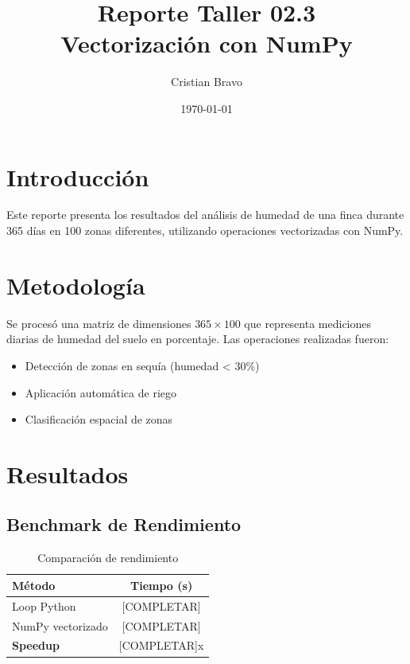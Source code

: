 \documentclass[11pt,a4paper]{article}
\title{Reporte Taller 02.3\\Vectorización con NumPy}
\author{Cristian Bravo}
\date{\today}
\begin{document}
\maketitle

\section{Introducción}

Este reporte presenta los resultados del análisis de humedad de una finca durante 365 días en 100 zonas diferentes, utilizando operaciones vectorizadas con NumPy.

\section{Metodología}

Se procesó una matriz de dimensiones $365 \times 100$ que representa mediciones diarias de humedad del suelo en porcentaje. Las operaciones realizadas fueron:

\begin{itemize}
    \item Detección de zonas en sequía (humedad < 30\%)
    \item Aplicación automática de riego
    \item Clasificación espacial de zonas
\end{itemize}

\section{Resultados}

\subsection{Benchmark de Rendimiento}


\begin{table}[h]
\centering
\begin{tabular}{lc}
\toprule
Método & Tiempo (s) \\
\midrule
Loop Python & [COMPLETAR] \\
NumPy vectorizado & [COMPLETAR] \\
\textbf{Speedup} & [COMPLETAR]x \\
\bottomrule
\end{tabular}
\caption{Comparación de rendimiento}
\end{table}
\end{document}
